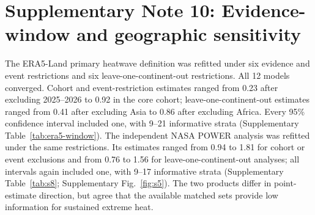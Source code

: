 \documentclass[11pt]{article}
\begin{document}
\section*{Supplementary Note 10: Evidence-window and geographic sensitivity}
The ERA5-Land primary heatwave definition was refitted under six evidence and event restrictions and six leave-one-continent-out restrictions. All 12 models converged. Cohort and event-restriction estimates ranged from 0.23 after excluding 2025--2026 to 0.92 in the core cohort; leave-one-continent-out estimates ranged from 0.41 after excluding Asia to 0.86 after excluding Africa. Every 95\% confidence interval included one, with 9--21 informative strata (Supplementary Table~\ref{tab:era5-window}). The independent NASA POWER analysis was refitted under the same restrictions. Its estimates ranged from 0.94 to 1.81 for cohort or event exclusions and from 0.76 to 1.56 for leave-one-continent-out analyses; all intervals again included one, with 9--17 informative strata (Supplementary Table~\ref{tab:s8}; Supplementary Fig.~\ref{fig:s5}). The two products differ in point-estimate direction, but agree that the available matched sets provide low information for sustained extreme heat.
\end{document}
